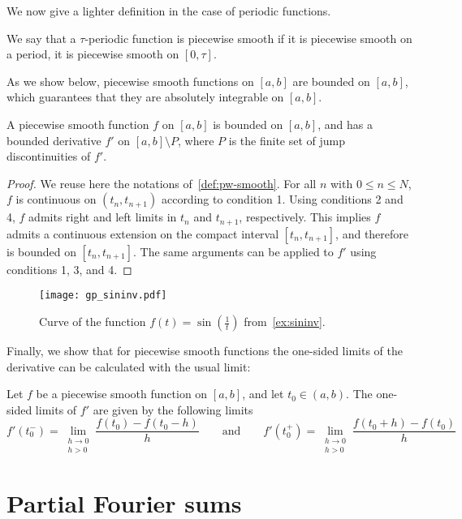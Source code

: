 We now give a lighter definition in the case of periodic functions.
\begin{definition}
  We say that a $\tau$-periodic function is piecewise smooth if it is piecewise smooth on a period, \eg it is piecewise smooth on $[0,\tau]$.
\end{definition}
As we show below, piecewise smooth functions on $[a,b]$ are bounded on $[a,b]$, which guarantees that
they are absolutely integrable on $[a,b]$.
\begin{proposition}
  A piecewise smooth function $f$ on $[a,b]$ is bounded on $[a,b]$, and has a bounded
  derivative $f'$ on $[a,b]\setminus P$, where $P$ is the finite set of jump
  discontinuities of $f'$.
\end{proposition}
\begin{proof}
  We reuse here the notations of~\cref{def:pw-smooth}. For all $n$ with $0\leq n\leq N$,
  $f$ is continuous on $(t_n,t_{n+1})$ according to condition 1. Using conditions 2 and 4,
  $f$ admits right and left limits in $t_n$ and $t_{n+1}$, respectively. This implies $f$
  admits a continuous extension on the compact interval $[t_n,t_{n+1}]$, and therefore is
  bounded on $[t_n,t_{n+1}]$. The same arguments can be applied to $f'$ using conditions
  1, 3, and 4.
\end{proof}
\begin{figure}[t]
  \centering
  \texttt{[image: gp\_sininv.pdf]}
  \caption{Curve of the function $f(t)=\sin(\frac{1}{t})$ from~\cref{ex:sininv}.}
  \label{fig:sininv}
\end{figure}
Finally, we show that for piecewise smooth functions the one-sided limits of the derivative
can be calculated with the usual limit:
\begin{proposition}
  Let $f$ be a piecewise smooth function on $[a,b]$, and let $t_0\in(a,b)$. The one-sided
  limits of $f'$ are given by the following limits
  \begin{equation}
    f'(t_0^-)=\lim_{\substack{h\to0\\h>0}}\frac{f(t_0)-f(t_0-h)}{h}
    \qquad\text{and}\qquad
    f'(t_0^+)=\lim_{\substack{h\to0\\h>0}}\frac{f(t_0+h)-f(t_0)}{h}
  \end{equation}
\end{proposition}

\section{Partial Fourier sums}
